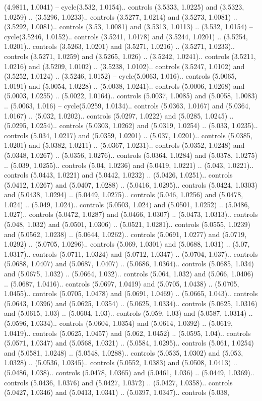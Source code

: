 (4.9811, 1.0041) -- cycle(3.532, 1.0154).. controls (3.5333, 1.0225) and (3.5323, 1.0259) .. (3.5296, 1.0233).. controls (3.5277, 1.0214) and (3.5273, 1.0081) .. (3.5292, 1.0081).. controls (3.53, 1.0081) and (3.5313, 1.0113) .. (3.532, 1.0154) -- cycle(3.5246, 1.0152).. controls (3.5241, 1.0178) and (3.5244, 1.0201) .. (3.5254, 1.0201).. controls (3.5263, 1.0201) and (3.5271, 1.0216) .. (3.5271, 1.0233).. controls (3.5271, 1.0259) and (3.5265, 1.026) .. (3.5242, 1.0241).. controls (3.5211, 1.0216) and (3.5209, 1.0102) .. (3.5238, 1.0102).. controls (3.5247, 1.0102) and (3.5252, 1.0124) .. (3.5246, 1.0152) -- cycle(5.0063, 1.016).. controls (5.0065, 1.0191) and (5.0054, 1.0228) .. (5.0038, 1.0241).. controls (5.0006, 1.0268) and (5.0003, 1.0255) .. (5.0022, 1.0164).. controls (5.0037, 1.0085) and (5.0058, 1.0083) .. (5.0063, 1.016) -- cycle(5.0259, 1.0134).. controls (5.0363, 1.0167) and (5.0364, 1.0167) .. (5.032, 1.0202).. controls (5.0297, 1.0222) and (5.0285, 1.0245) .. (5.0295, 1.0254).. controls (5.0303, 1.0262) and (5.0319, 1.0254) .. (5.033, 1.0235).. controls (5.034, 1.0217) and (5.0359, 1.0201) .. (5.037, 1.0201).. controls (5.0385, 1.0201) and (5.0382, 1.0211) .. (5.0367, 1.0231).. controls (5.0352, 1.0248) and (5.0348, 1.0267) .. (5.0356, 1.0276).. controls (5.0364, 1.0284) and (5.0378, 1.0275) .. (5.039, 1.0255).. controls (5.04, 1.0236) and (5.0419, 1.0221) .. (5.043, 1.0221).. controls (5.0443, 1.0221) and (5.0442, 1.0232) .. (5.0426, 1.0251).. controls (5.0412, 1.0267) and (5.0407, 1.0288) .. (5.0416, 1.0295).. controls (5.0424, 1.0303) and (5.0438, 1.0294) .. (5.0449, 1.0275).. controls (5.046, 1.0256) and (5.0478, 1.024) .. (5.049, 1.024).. controls (5.0503, 1.024) and (5.0501, 1.0252) .. (5.0486, 1.027).. controls (5.0472, 1.0287) and (5.0466, 1.0307) .. (5.0473, 1.0313).. controls (5.048, 1.032) and (5.0501, 1.0306) .. (5.0521, 1.0281).. controls (5.0555, 1.0239) and (5.0562, 1.0238) .. (5.0644, 1.0262).. controls (5.0691, 1.0277) and (5.0719, 1.0292) .. (5.0705, 1.0296).. controls (5.069, 1.0301) and (5.0688, 1.031) .. (5.07, 1.0317).. controls (5.0711, 1.0324) and (5.0712, 1.0347) .. (5.0704, 1.037).. controls (5.0688, 1.0407) and (5.0687, 1.0407) .. (5.0686, 1.0364).. controls (5.0685, 1.034) and (5.0675, 1.032) .. (5.0664, 1.032).. controls (5.064, 1.032) and (5.066, 1.0406) .. (5.0687, 1.0416).. controls (5.0697, 1.0419) and (5.0705, 1.0438) .. (5.0705, 1.0455).. controls (5.0705, 1.0478) and (5.0691, 1.0469) .. (5.0665, 1.043).. controls (5.0643, 1.0396) and (5.0625, 1.0354) .. (5.0625, 1.0334).. controls (5.0625, 1.0316) and (5.0615, 1.03) .. (5.0604, 1.03).. controls (5.059, 1.03) and (5.0587, 1.0314) .. (5.0596, 1.0334).. controls (5.0604, 1.0354) and (5.0614, 1.0392) .. (5.0619, 1.0419).. controls (5.0625, 1.0457) and (5.062, 1.0452) .. (5.0595, 1.04).. controls (5.0571, 1.0347) and (5.0568, 1.0321) .. (5.0584, 1.0295).. controls (5.061, 1.0254) and (5.0581, 1.0248) .. (5.0548, 1.0288).. controls (5.0535, 1.0302) and (5.053, 1.0328) .. (5.0536, 1.0345).. controls (5.0552, 1.0383) and (5.0508, 1.0413) .. (5.0486, 1.038).. controls (5.0478, 1.0365) and (5.0461, 1.036) .. (5.0449, 1.0369).. controls (5.0436, 1.0376) and (5.0427, 1.0372) .. (5.0427, 1.0358).. controls (5.0427, 1.0346) and (5.0413, 1.0341) .. (5.0397, 1.0347).. controls (5.038, 